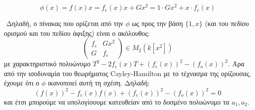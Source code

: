 \documentclass[oneside,a4paper]{article}
\newcommand {\tl}{\textlatin}
\begin{document}
$$\phi(x) = f(x)x = f_e(x) x + Gx^2 = 1 \cdot Gx^2 + x \cdot f_e(x)$$

$ $\newline
Δηλαδή, ο πίνακας που ορίζεται από την $\phi$ ως προς την βάση $\{1,x\}$ (και του πεδίου ορισμού και του πεδίου άφιξης) είναι ο ακόλουθος: $$\begin{pmatrix}
f_e & Gx^2 \\
G & f_e
\end{pmatrix} \in M_2 (k[x^2])$$ με χαρακτηριστικό πολυώνυμο $T^2 -2 f_e(x)T + \left(f_e(x)\right)^2 - \left(f_o(x)\right)^2$. Άρα από την ισοδυναμία του θεωρήματος \tl{Cayley-Hamilton} με το τέχνασμα της ορίζουσας, έχουμε ότι ο $\phi$ ικανοποιεί αυτή τη σχέση. Δηλαδή:
$$\left(f(x)\right)^2 - f_e(x)f(x) + \left(f_e(x)\right)^2 - \left(f_o(x)\right)^2 = 0$$ και έτσι μπορούμε να υπολογίσουμε κατευθείαν από το δοσμένο πολυώνυμο τα $a_1,a_2$.
\pagebreak
\end{document}
